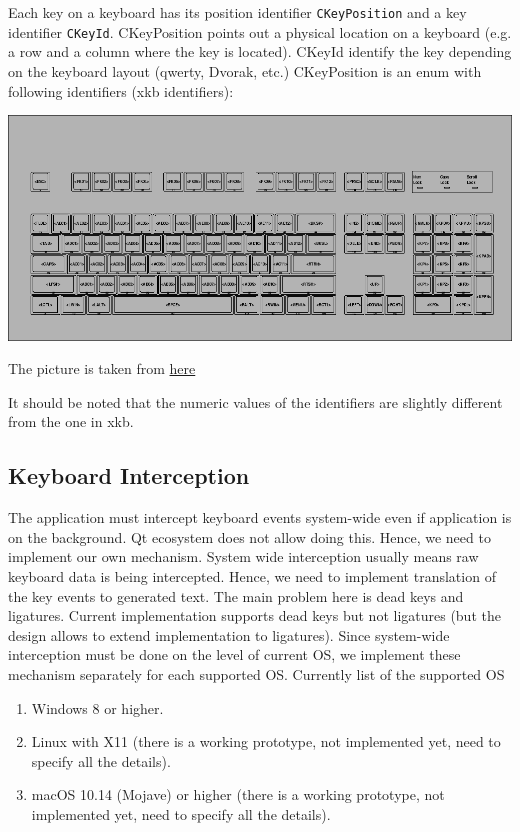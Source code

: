 \documentclass{article}
\begin{document}
Each key on a keyboard has its position identifier \verb"CKeyPosition" and a key identifier \verb"CKeyId". CKeyPosition points out a physical location on a keyboard (e.g. a row and a column where the key is located). CKeyId identify the key depending on the keyboard layout (qwerty, Dvorak, etc.) CKeyPosition is an enum with following identifiers (xkb identifiers):
\begin{center}
\includegraphics[scale = 0.5]{Figures/KeyPosition.png}

The picture is taken from \href{https://www.charvolant.org/doug/xkb/html/node5.html}{here}
\end{center}
It should be noted that the numeric values of the identifiers are slightly different from the one in xkb.

\subsection{Keyboard Interception}

The application must intercept keyboard events system-wide even if application is on the background. Qt ecosystem does not allow doing this. Hence, we need to implement our own mechanism. System wide interception usually means raw keyboard data is being intercepted. Hence, we need to implement translation of the key events to generated text. The main problem here is dead keys and ligatures. Current implementation supports dead keys but not ligatures (but the design allows to extend implementation to ligatures). Since system-wide interception must be done on the level of current OS, we implement these mechanism separately for each supported OS. Currently list of the supported OS
\begin{enumerate}
\item Windows 8 or higher.
\item Linux with X11 (there is a working prototype, not implemented yet, need to specify all the details).
\item macOS 10.14 (Mojave) or higher (there is a working prototype, not implemented yet, need to specify all the details).
\end{enumerate}
\end{document}
